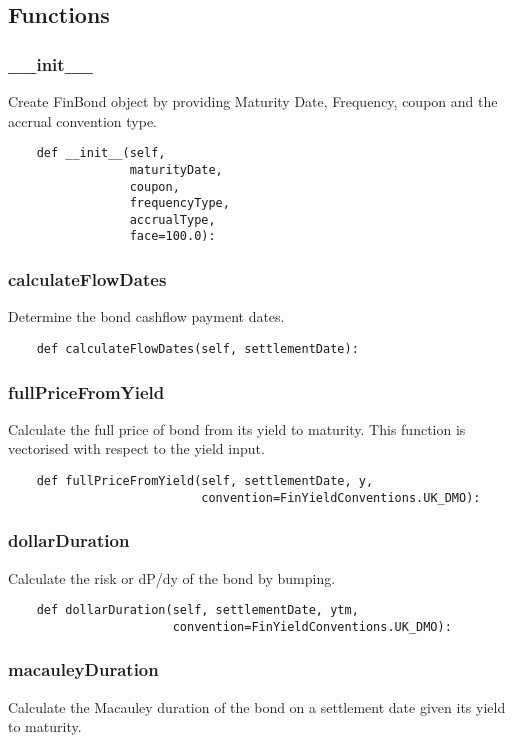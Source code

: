 \documentclass[twoside,11pt]{book}
\begin{document}
\subsection*{Functions}

\subsubsection*{{\bf \_\_init\_\_}}
Create FinBond object by providing Maturity Date, Frequency, coupon and the accrual convention type.  

\begin{lstlisting}
    def __init__(self,
                 maturityDate,
                 coupon,
                 frequencyType,
                 accrualType,
                 face=100.0):
\end{lstlisting}

\subsubsection*{{\bf calculateFlowDates}}
Determine the bond cashflow payment dates.  

\begin{lstlisting}
    def calculateFlowDates(self, settlementDate):
\end{lstlisting}

\subsubsection*{{\bf fullPriceFromYield}}
Calculate the full price of bond from its yield to maturity. This function is vectorised with respect to the yield input.  

\begin{lstlisting}
    def fullPriceFromYield(self, settlementDate, y,
                           convention=FinYieldConventions.UK_DMO):
\end{lstlisting}

\subsubsection*{{\bf dollarDuration}}
Calculate the risk or dP/dy of the bond by bumping.  

\begin{lstlisting}
    def dollarDuration(self, settlementDate, ytm,
                       convention=FinYieldConventions.UK_DMO):
\end{lstlisting}

\subsubsection*{{\bf macauleyDuration}}
Calculate the Macauley duration of the bond on a settlement date given its yield to maturity.  
\end{document}

